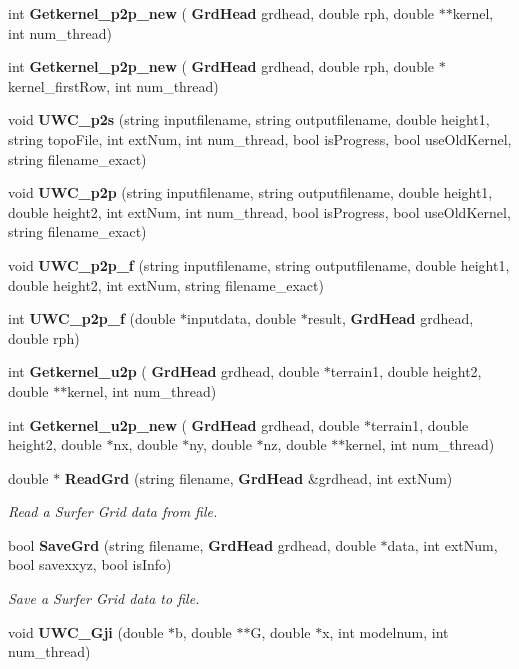 \begin{DoxyCompactItemize}
\item 
int \textbf{ Getkernel\+\_\+p2p\+\_\+new} (\textbf{ Grd\+Head} grdhead, double rph, double $\ast$$\ast$kernel, int num\+\_\+thread)
\item 
int \textbf{ Getkernel\+\_\+p2p\+\_\+new} (\textbf{ Grd\+Head} grdhead, double rph, double $\ast$kernel\+\_\+first\+Row, int num\+\_\+thread)
\item 
void \textbf{ U\+W\+C\+\_\+p2s} (string inputfilename, string outputfilename, double height1, string topo\+File, int ext\+Num, int num\+\_\+thread, bool is\+Progress, bool use\+Old\+Kernel, string filename\+\_\+exact)
\item 
void \textbf{ U\+W\+C\+\_\+p2p} (string inputfilename, string outputfilename, double height1, double height2, int ext\+Num, int num\+\_\+thread, bool is\+Progress, bool use\+Old\+Kernel, string filename\+\_\+exact)
\item 
void \textbf{ U\+W\+C\+\_\+p2p\+\_\+f} (string inputfilename, string outputfilename, double height1, double height2, int ext\+Num, string filename\+\_\+exact)
\item 
int \textbf{ U\+W\+C\+\_\+p2p\+\_\+f} (double $\ast$inputdata, double $\ast$result, \textbf{ Grd\+Head} grdhead, double rph)
\item 
int \textbf{ Getkernel\+\_\+u2p} (\textbf{ Grd\+Head} grdhead, double $\ast$terrain1, double height2, double $\ast$$\ast$kernel, int num\+\_\+thread)
\item 
int \textbf{ Getkernel\+\_\+u2p\+\_\+new} (\textbf{ Grd\+Head} grdhead, double $\ast$terrain1, double height2, double $\ast$nx, double $\ast$ny, double $\ast$nz, double $\ast$$\ast$kernel, int num\+\_\+thread)
\item 
double $\ast$ \textbf{ Read\+Grd} (string filename, \textbf{ Grd\+Head} \&grdhead, int ext\+Num)
\begin{DoxyCompactList}\small\item\em Read a Surfer Grid data from file. \end{DoxyCompactList}\item 
bool \textbf{ Save\+Grd} (string filename, \textbf{ Grd\+Head} grdhead, double $\ast$data, int ext\+Num, bool savexxyz, bool is\+Info)
\begin{DoxyCompactList}\small\item\em Save a Surfer Grid data to file. \end{DoxyCompactList}\item 
void \textbf{ U\+W\+C\+\_\+\+Gji} (double $\ast$b, double $\ast$$\ast$G, double $\ast$x, int modelnum, int num\+\_\+thread)

\end{DoxyCompactItemize}
